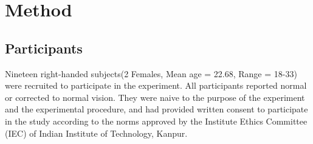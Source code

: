 

\section{Method}

\subsection{Participants}
Nineteen right-handed subjects(2 Females, Mean age = 22.68, Range = 18-33) were recruited to participate in the experiment. All participants reported normal or corrected to normal vision. They were naive to the purpose of the experiment and the experimental procedure, and had provided written consent to participate in the study according to the norms approved by the Institute Ethics Committee (IEC) of Indian Institute of Technology, Kanpur. 

